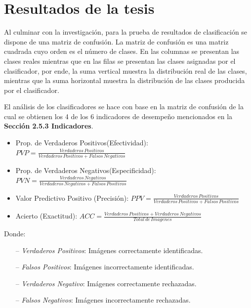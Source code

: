 \chapter{Resultados de la tesis}
\setcounter{page}{116}
\renewcommand{\baselinestretch}{1.2} %
	
	Al culminar con la investigación, para la prueba de resultados de clasificación se dispone de una matriz de confusión. La matriz de confusión es una matriz cuadrada cuyo orden es el número de clases. En las  columnas se presentan las clases reales mientras que en las filas se presentan las clases asignadas por el clasificador, por ende, la suma vertical muestra la distribución real de las clases, mientras que la suma horizontal muestra la distribución de las clases producida por el clasificador.

	El análisis de los clasificadores se hace con base en la matriz de confusión de la cual se obtienen los 4 de los 6 indicadores de desempeño mencionados en la \textbf{Sección 2.5.3 Indicadores}.

	\begin{itemize}

	\item Prop. de Verdaderos Positivos(Efectividad): {$PVP= \frac{Verdaderos\,Positivos}{{Verdaderos\,Positivos} + {Falsos\,Negativos}}$}
	\item Prop. de Verdaderos Negativos(Especificidad): {$PVN= \frac{Verdaderos\,Negativos}{{Verdaderos\,Negativos} + {Falsos\,Positivos}}$}
	\item Valor Predictivo Positivo (Precisión): {$PPV = \frac{Verdaderos\,Positivos}{{Verdaderos\,Positivos}+{Falsos\,Positivos}}$}
	\item Acierto (Exactitud): {$ACC= \frac{Verdaderos\,Positivos+Verdaderos\,Negativos}{Total\,de\,Imagenes}$}
	\end{itemize}	
	Donde:
	\begin{itemize}
		\item[--] \textit{Verdaderos Positivos}: Imágenes correctamente identificadas.
		\item[--] \textit{Falsos Positivos}: Imágenes incorrectamente identificadas.
		\item[--] \textit{Verdaderos Negativo}: Imágenes correctamente rechazadas.
		\item[--] \textit{Falsos Negativos}: Imágenes incorrectamente rechazadas.
	\end{itemize}
	
